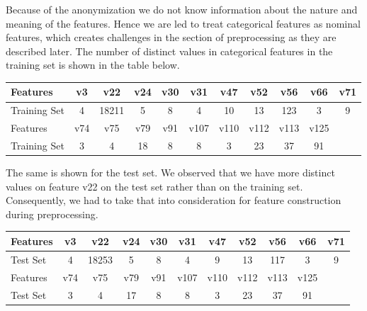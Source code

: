\documentclass[conference, onecolumn]{IEEEtran}
\begin{document}
Because of the anonymization we do not know information about the nature and meaning of the features. Hence we are led to treat categorical features as nominal features, which creates challenges in the section of preprocessing as they are described later. The number of distinct values in categorical features in the training set is shown in the table below.
%
\begin{center}
\begin{tabular}{ |l|c|c|c|c|c|c|c|c|c|c| } 
 \hline
 Features & v3 & v22 & v24 & v30 & v31 & v47 & v52 & v56 & v66 & v71  \\ \hline
 Training Set & 4	& 18211	& 5	& 8 & 4 &	10 &	13	& 123	& 3 & 9\\ \hline
 Features & v74 & v75 & v79 & v91 & v107 & v110 & v112 & v113 & v125&\phantom{1}\\ \hline
  Training Set &  3 & 4 & 18 & 8	& 8	& 3	& 23	& 37	& 91&\phantom{1}\\ \hline
\end{tabular}
\end{center}
The same is shown for the test set. We observed that we have more distinct values on feature v22 on the test set rather than on the training set. Consequently, we had to take that into consideration for feature construction during preprocessing.
\begin{center}
\begin{tabular}{ |l|c|c|c|c|c|c|c|c|c|c| } 
 \hline
 Features & v3 & v22 & v24 & v30 & v31 & v47 & v52 & v56 & v66 & v71  \\ \hline
 Test Set & 4 & 18253 & 5 & 8 & 4 & 9 & 13 & 117 & 3&  9\\ \hline
 Features & v74 & v75 & v79 & v91 & v107 & v110 & v112 & v113 & v125&\phantom{1}\\ \hline
  Test Set 	&3	&4&	17& 8 & 	8&	3	&23	&37	&91 &\phantom{1}\\ \hline
\end{tabular}
\end{center}
\end{document}
